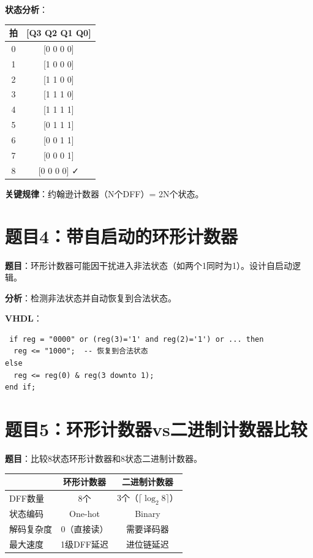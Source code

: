 \textbf{状态分析}：
\begin{center}
\begin{tabular}{|c|c|}
\hline
拍 & [Q3 Q2 Q1 Q0] \\
\hline
0 & [0 0 0 0] \\
1 & [1 0 0 0] \\
2 & [1 1 0 0] \\
3 & [1 1 1 0] \\
4 & [1 1 1 1] \\
5 & [0 1 1 1] \\
6 & [0 0 1 1] \\
7 & [0 0 0 1] \\
8 & [0 0 0 0] ✓ \\
\hline
\end{tabular}
\end{center}

\textbf{关键规律}：约翰逊计数器（N个DFF）= 2N个状态。

\section*{题目4：带自启动的环形计数器}

\textbf{题目}：环形计数器可能因干扰进入非法状态（如两个1同时为1）。设计自启动逻辑。

\textbf{分析}：检测非法状态并自动恢复到合法状态。

\textbf{VHDL}：
\begin{lstlisting}
 if reg = "0000" or (reg(3)='1' and reg(2)='1') or ... then
  reg <= "1000";  -- 恢复到合法状态
else
  reg <= reg(0) & reg(3 downto 1);
end if;
\end{lstlisting}

\section*{题目5：环形计数器vs二进制计数器比较}

\textbf{题目}：比较8状态环形计数器和8状态二进制计数器。

\begin{center}
\begin{tabular}{|l|c|c|}
\hline
 & \textbf{环形计数器} & \textbf{二进制计数器} \\
\hline
DFF数量 & 8个 & 3个（$\lceil\log_2 8\rceil$）\\
状态编码 & One-hot & Binary \\
解码复杂度 & 0（直接读）& 需要译码器 \\
最大速度 & 1级DFF延迟 & 进位链延迟 \\
\hline
\end{tabular}
\end{center}

